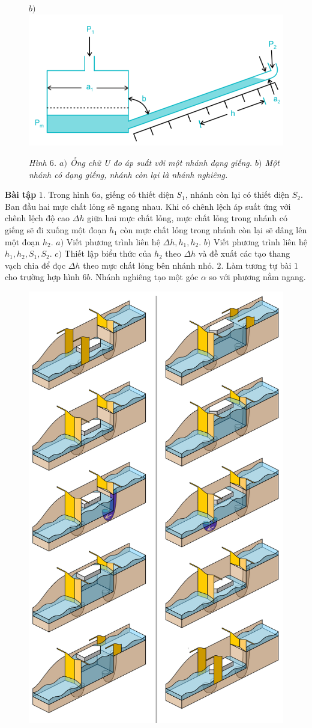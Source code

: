 \begin{multicols}{2}
\begin{figure}[H]
		$b)$\includegraphics[height = 0.31\linewidth]{11}
		\caption{\small\textit{\color{timhieukhoahoc}Hình $6$. $a)$ Ống chữ U đo áp suất với một nhánh dạng giếng. $b)$ Một nhánh có dạng giếng, nhánh còn lại là nhánh nghiêng.}}
		\vspace*{-10pt}
	\end{figure}
	\textbf{\color{timhieukhoahoc}Bài tập}
	\vskip 0.1cm
	$1$. Trong hình $6a$, giếng có thiết diện $S_1$, nhánh còn lại có thiết diện $S_2$. Ban đầu hai mực chất lỏng sẽ ngang nhau. Khi có chênh lệch áp suất ứng với chênh lệch độ cao $\Delta h$ giữa hai mực chất lỏng, mực chất lỏng trong nhánh có giếng sẽ đi xuống một đoạn $h_1$ còn mực chất lỏng trong nhánh còn lại sẽ dâng lên một đoạn $h_2$.
	\vskip 0.1cm
	$a)$ Viết phương trình liên hệ $\Delta h,h_1,h_2$.
	\vskip 0.1cm
	$b)$ Viết phương trình liên hệ $h_1,h_2,S_1,S_2$.
	\vskip 0.1cm
	$c)$ Thiết lập biểu thức của $h_2$ theo $\Delta h$ và đề xuất các tạo thang vạch chia để đọc $\Delta h$ theo mực chất lỏng bên nhánh nhỏ.
	\vskip 0.1cm
	$2.$ Làm tương tự bài $1$ cho trường hợp hình $6b$. Nhánh nghiêng tạo một góc $\alpha$ so với phương nằm ngang.
	\begin{figure}[H]
		\vspace*{-5pt}
		\centering
		\captionsetup{labelformat= empty, justification=centering}
		\includegraphics[width= 0.5\linewidth]{12}

\end{figure}
\end{multicols}
